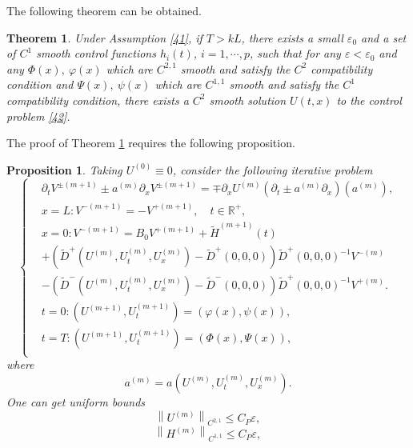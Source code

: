 \documentclass[a4paper,reqno,11pt]{amsart}
\numberwithin{equation}{section} %
\newtheorem{prop}[lem]{Proposition}
\newtheorem{thm}{Theorem}
\begin{document}
The following theorem can be obtained.
\begin{thm} \label{thm:main}
	Under Assumption \eqref{41}, if $T > kL$, there exists a small $\varepsilon _0$ and a set of $C^1$ smooth control functions $h_i(t)$, $i=1,\cdots ,p$, such that for any $\varepsilon < \varepsilon _0 $ and any $\varPhi (x),\ \varphi  (x)$ which are $C^{2,1}$ smooth and satisfy the $C^2$ compatibility condition and $\varPsi (x),\ \psi (x)$ which are $C^{1,1}$ smooth and satisfy the $C^1$ compatibility condition, there exists a $C^2$ smooth solution $U(t,x)$ to the control problem \eqref{42}.
\end{thm}

The proof of Theorem \ref{thm:main} requires the following proposition.
\begin{prop}\label{prop:main}
	Taking $U^{(0)}\equiv 0$, consider the following iterative problem
	\begin{equation}
\begin{cases}
	&		\partial _tV^{\pm (m+1)}\pm a^{(m)}\partial _xV^{\pm (m+1)}=\mp \partial _xU^{(m)}\left( \partial _t\pm a^{(m)}\partial _x \right) \left( a^{(m)} \right) ,\\
	&		x=L:V^{-(m+1)}=-V^{+(m+1)},\quad t\in \mathbb{R} ^+,\\
	&		x=0:V^{-(m+1)}=B_0V^{+(m+1)}+\widetilde{H}^{(m+1)}(t)\\
	&		+\left( \widetilde{D}^+\left( U^{(m)},U_{t}^{(m)},U_{x}^{(m)} \right) -\widetilde{D}^+(0,0,0) \right) \widetilde{D}^+(0,0,0)^{-1}V^{-(m)}\\
	&		-\left( \widetilde{D}^-\left( U^{(m)},U_{t}^{(m)},U_{x}^{(m)} \right) -\widetilde{D}^-(0,0,0) \right) \widetilde{D}^+(0,0,0)^{-1}V^{+(m)}.\\
	&		t=0:\left( U^{(m+1)},U_{t}^{(m+1)} \right) =\left( \varphi \left( x \right) ,\psi \left( x \right) \right) ,\\
	&		t=T:\left( U^{(m+1)},U_{t}^{(m+1)} \right) =\left( \varPhi \left( x \right) ,\varPsi \left( x \right) \right) ,\\
\end{cases}
	\end{equation}
where
$$
a^{(m)}=a\left(U^{(m)}, U_t^{(m)}, U_x^{(m)}\right) .
$$
One can get uniform bounds
\begin{equation}\label{bounds u}
 \left\lVert U^{\left( m \right)}\right\rVert  _{C^{2,1}}\leq C_P\varepsilon ,
\end{equation}
\begin{equation}\label{bounds h}
 \left\lVert H^{\left( m \right)}\right\rVert  _{C^{1,1}}\leq C_P\varepsilon ,

\end{equation}
\end{prop}
\end{document}
